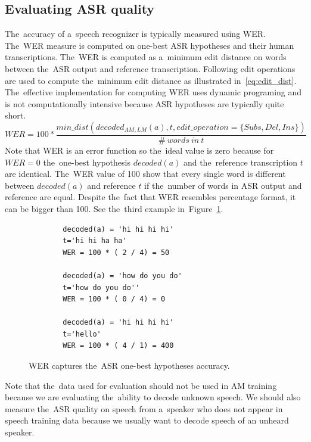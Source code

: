 \subsection[Evaluating \acs{ASR} quality]{Evaluating \acl{ASR} quality}
\label{sub:eval}

The~accuracy of a~speech recognizer is typically measured using \acl{WER}.
The~\ac{WER} measure is computed on one-best \ac{ASR} hypotheses and their human transcriptions.
The~\ac{WER} is computed as a~minimum edit distance on words between the~\ac{ASR} output and reference transcription.
Following edit operations are used  to compute the~minimum edit distance as illustrated in~\ref{eq:edit_dist}.
The~effective implementation for computing WER uses dynamic programing and is not computationally intensive because \ac{ASR} hypotheses are typically quite short.
\begin{equation} \label{eq:edit_dist}
    WER = 100* \frac{min\_dist(decoded_{AM, LM}(a), t, edit\_operation=\{Subs, Del, Ins\})}{\#\ words\ in\ t}
\end{equation}
Note that \ac{WER} is an error function so the~ideal value is zero because for $WER=0$ the~one-best hypothesis $decoded(a)$ and the~reference transcription $t$ are identical.
The~\ac{WER} value of 100 show that every single word is different between $decoded(a)$ and reference $t$ if the~number of words in \ac{ASR} output and reference are equal.
Despite the~fact that \ac{WER} resembles percentage format, it can be bigger than 100. 
See the~third example in~Figure~\ref{fig:wer400}.
\begin{figure}[!htp]
    \begin{center}
    \begin{verbatim}
        decoded(a) = 'hi hi hi hi'
        t='hi hi ha ha'
        WER = 100 * ( 2 / 4) = 50 

        decoded(a) = 'how do you do'
        t='how do you do''
        WER = 100 * ( 0 / 4) = 0

        decoded(a) = 'hi hi hi hi'
        t='hello'
        WER = 100 * ( 4 / 1) = 400
    \end{verbatim}
    \caption{\acs{WER} captures the~\ac{ASR} one-best hypotheses accuracy.}
    \label{fig:wer400} 
    \end{center}
\end{figure}

Note that the~data used for evaluation should not be used in \ac{AM} training because we are evaluating the~ability to decode unknown speech.
We should also measure the~\ac{ASR} quality on speech from a~speaker who does not appear in speech training data because we usually want to decode speech of an unheard speaker.

